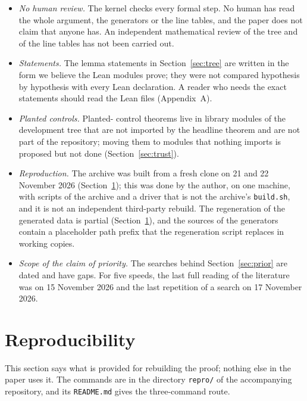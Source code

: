 \documentclass[11pt]{article}
\theoremstyle{remark}
\begin{document}
\begin{itemize}
\item \emph{No human review.} The kernel checks every formal step. No human has read the whole argument, the generators or the line tables, and the paper does not claim that anyone has. An independent mathematical review of the tree and of the line tables has not been carried out.
\item \emph{Statements.} The lemma statements in Section~\ref{sec:tree} are written in the form we believe the Lean modules prove; they were not compared hypothesis by hypothesis with every Lean declaration. A reader who needs the exact statements should read the Lean files (Appendix~A).
\item \emph{Planted controls.} Planted- control theorems live in library modules of the development tree that are not imported by the headline theorem and are not part of the repository; moving them to modules that nothing imports is proposed but not done (Section~\ref{sec:trust}).
\item \emph{Reproduction.} The archive was built from a fresh clone on 21 and 22 November 2026 (Section~\ref{sec:repro}); this was done by the author, on one machine, with scripts of the archive and a driver that is not the archive's \texttt{build.sh}, and it is not an independent third-party rebuild. The regeneration of the generated data is partial (Section~\ref{sec:repro}), and the sources of the generators contain a placeholder path prefix that the regeneration script replaces in working copies.
\item \emph{Scope of the claim of priority.} The searches behind Section~\ref{sec:prior} are dated and have gaps. For five speeds, the last full reading of the literature was on 15 November 2026 and the last repetition of a search on 17 November 2026.
\end{itemize}

\section{Reproducibility}\label{sec:repro}

This section says what is provided for rebuilding the proof; nothing else in the paper uses it. The commands are in the directory \texttt{repro/} of the accompanying repository, and its \texttt{README.md} gives the three-command route.
\end{document}
